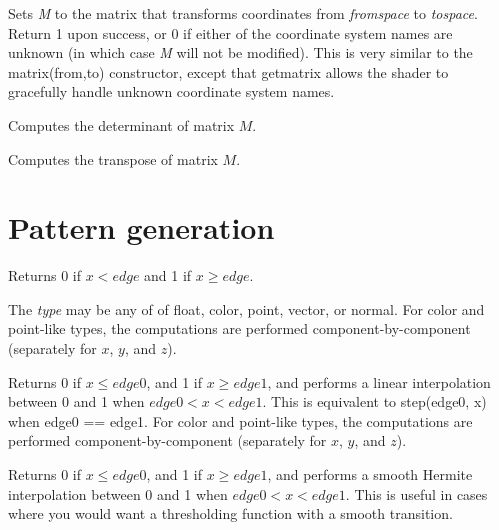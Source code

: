 \documentclass[11pt,letterpaper]{book}
\def\color{{\cf color}\xspace}
\def\float{{\cf float}\xspace}
\def\matrix{{\cf matrix}\xspace}
\def\normal{{\cf normal}\xspace}
\def\point{{\cf point}\xspace}
\def\vector{{\cf vector}\xspace}
\begin{document}

Sets \emph{M} to the \matrix that transforms coordinates from
\emph{fromspace} to \emph{tospace}.  Return 1 upon success, or 0 if
either of the coordinate system names are unknown (in which case
\emph{M} will not be modified).  This is very similar to the
{\cf matrix(from,to)} constructor, except that {\cf getmatrix} allows
the shader to gracefully handle unknown coordinate system names.
\apiend

Computes the determinant of matrix $M$.
\apiend

Computes the transpose of matrix $M$.
\apiend



\section{Pattern generation}
\label{sec:stdlib:pattern}

Returns 0 if $x < {\mathit edge}$ and 1 if $x \ge {\mathit edge}$.

The \emph{type} may be any of of \float, \color, \point, \vector, or
\normal.  For \color and \point-like types, the computations are
performed component-by-component (separately for $x$, $y$, and $z$).
\apiend

Returns 0 if $x \le {\mathit edge0}$, and 1 if $x \ge {\mathit edge1}$,
and performs a linear
interpolation between 0 and 1 when ${\mathit edge0} < x < {\mathit edge1}$.
This is equivalent to {\cf step(edge0, x)} when {\cf edge0 == edge1}.
For \color and \point-like types, the computations are
performed component-by-component (separately for $x$, $y$, and $z$).
\apiend

Returns 0 if $x \le {\mathit edge0}$, and 1 if $x \ge {\mathit edge1}$,
and performs a smooth Hermite
interpolation between 0 and 1 when ${\mathit edge0} < x < {\mathit edge1}$.
This is useful in cases where you would want a thresholding function
with a smooth transition.
\end{document}
